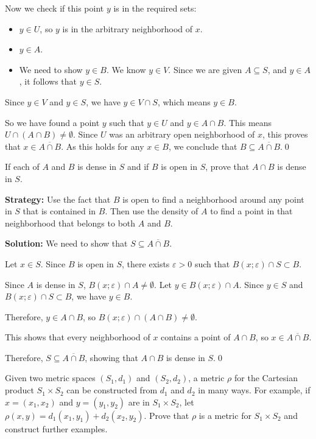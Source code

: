 Now we check if this point $y$ is in the required sets:
\begin{itemize}
    \item $y \in U$, so $y$ is in the arbitrary neighborhood of $x$.
    \item $y \in A$.
    \item We need to show $y \in B$. We know $y \in V$. Since we are given $A \subseteq S$, and $y \in A$, it follows that $y \in S$.
\end{itemize}
Since $y \in V$ and $y \in S$, we have $y \in V \cap S$, which means $y \in B$.

So we have found a point $y$ such that $y \in U$ and $y \in A \cap B$. This means $U \cap (A \cap B) \neq \emptyset$.
Since $U$ was an arbitrary open neighborhood of $x$, this proves that $x \in \overline{A \cap B}$.
As this holds for any $x \in B$, we conclude that $B \subseteq \overline{A \cap B}$.\qed


\begin{problembox}
If each of \( A \) and \( B \) is dense in \( S \) and if \( B \) is open in \( S \), prove that \( A \cap B \) is dense in \( S \).
\end{problembox}

\noindent\textbf{Strategy:} Use the fact that $B$ is open to find a neighborhood around any point in $S$ that is contained in $B$. Then use the density of $A$ to find a point in that neighborhood that belongs to both $A$ and $B$.

\bigskip\noindent\textbf{Solution:} We need to show that $S \subseteq \overline{A \cap B}$.

Let $x \in S$. Since $B$ is open in $S$, there exists $\varepsilon > 0$ such that $B(x;\varepsilon) \cap S \subset B$.

Since $A$ is dense in $S$, $B(x;\varepsilon) \cap A \neq \emptyset$. Let $y \in B(x;\varepsilon) \cap A$. Since $y \in S$ and $B(x;\varepsilon) \cap S \subset B$, we have $y \in B$.

Therefore, $y \in A \cap B$, so $B(x;\varepsilon) \cap (A \cap B) \neq \emptyset$.

This shows that every neighborhood of $x$ contains a point of $A \cap B$, so $x \in \overline{A \cap B}$.

Therefore, $S \subseteq \overline{A \cap B}$, showing that $A \cap B$ is dense in $S$.\qed


\begin{problembox}
Given two metric spaces \((S_1, d_1)\) and \((S_2, d_2)\), a metric \( \rho \) for the Cartesian product \( S_1 \times S_2 \) can be constructed from \( d_1 \) and \( d_2 \) in many ways. For example, if \( x = (x_1, x_2) \) and \( y = (y_1, y_2) \) are in \( S_1 \times S_2 \), let \( \rho(x, y) = d_1(x_1, y_1) + d_2(x_2, y_2) \). Prove that \( \rho \) is a metric for \( S_1 \times S_2 \) and construct further examples.
\end{problembox}

